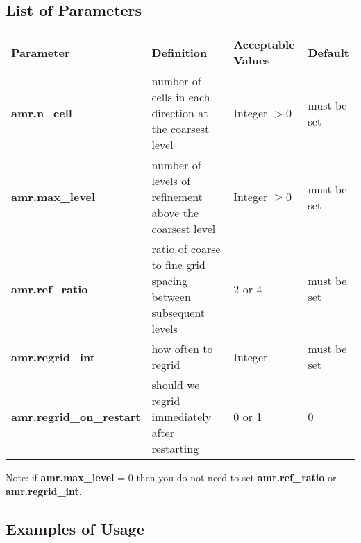 \subsection{List of Parameters}

\begin{table*}[h]
\begin{scriptsize}
\begin{center}
\begin{tabular}{|l|l|l|l|} \hline
Parameter & Definition & Acceptable Values &Default\\
\hline
{\bf amr.n\_cell} &  number of cells in each direction at the coarsest level & Integer $> 0$ & must be set \\
{\bf amr.max\_level} &  number of levels of refinement above the coarsest level& Integer $\geq 0$  & must be set \\
{\bf amr.ref\_ratio} & ratio of coarse to fine grid spacing between subsequent levels & 2 or 4 & must be set \\
{\bf amr.regrid\_int} & how often to regrid & Integer & must be set \\
{\bf amr.regrid\_on\_restart} & should we regrid immediately after restarting & 0 or 1 & 0 \\
\hline
\end{tabular}
\label{Table:ResInputs}
\end{center}
\end{scriptsize}
\end{table*}

\noindent Note: if {\bf amr.max\_level} = 0 then you do not need to set {\bf amr.ref\_ratio} or {\bf amr.regrid\_int}.

\subsection{Examples of Usage}

